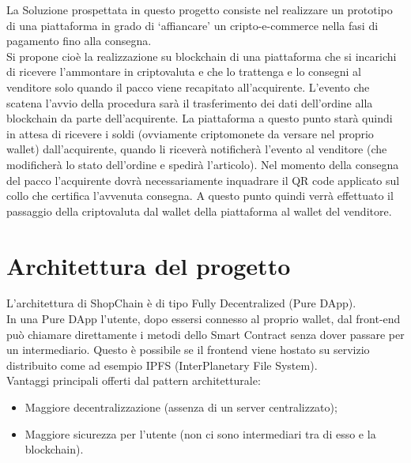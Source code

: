 La Soluzione prospettata in questo progetto consiste nel realizzare un prototipo di una piattaforma in grado di ‘affiancare’ un cripto-e-commerce nella fasi di pagamento fino alla consegna.\\
Si propone cioè la realizzazione su blockchain di una piattaforma che si incarichi di ricevere l’ammontare in criptovaluta e che lo trattenga e lo consegni al venditore solo quando il pacco viene recapitato all’acquirente. L’evento che scatena l’avvio della procedura sarà il trasferimento dei dati dell’ordine alla blockchain da parte dell’acquirente. La piattaforma a questo punto starà quindi in attesa di ricevere i soldi (ovviamente criptomonete da versare nel proprio wallet) dall’acquirente, quando li riceverà notificherà l’evento al venditore (che modificherà lo stato dell’ordine e spedirà l’articolo). Nel momento della consegna del pacco l’acquirente dovrà necessariamente inquadrare il QR code applicato sul collo che certifica l’avvenuta consegna. A questo punto quindi verrà effettuato il passaggio della criptovaluta dal wallet della piattaforma al wallet del venditore.\\

\newpage
\section{Architettura del progetto}
L’architettura di ShopChain è di tipo Fully Decentralized (Pure DApp).\\
In una Pure DApp l'utente, dopo essersi connesso al proprio wallet, dal front-end può chiamare direttamente i metodi dello Smart Contract senza dover passare per un intermediario.
Questo è possibile se il frontend viene hostato su servizio distribuito come ad esempio IPFS (InterPlanetary File System).\cite{site:ipfs}\\[0.2cm]
Vantaggi principali offerti dal pattern architetturale:
\begin{itemize}
    \item Maggiore decentralizzazione (assenza di un server centralizzato);
    \item Maggiore sicurezza per l'utente (non ci sono intermediari tra di esso e la blockchain).
\end{itemize}

